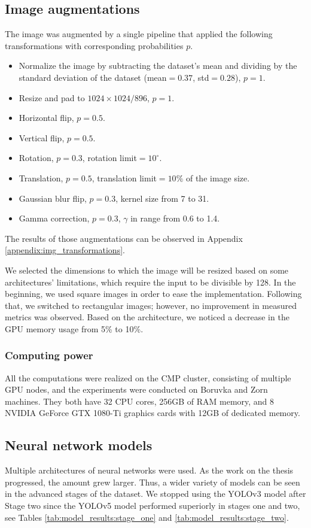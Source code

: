 \subsection{Image augmentations}
\label{sec:image_augmentations}
The image was augmented by a single pipeline that applied the following transformations with corresponding probabilities $p$.
\begin{itemize}
    \item Normalize the image by subtracting the dataset's mean and dividing by the standard deviation of the dataset (mean$=0.37$, std$=0.28$), $p=1$.
    \item Resize and pad to $1024\times1024/896$, $p=1$.
    \item Horizontal flip, $p=0.5$.
    \item Vertical flip, $p=0.5$.
    \item Rotation, $p=0.3$, rotation limit$=10^{\circ}$.
    \item Translation, $p=0.5$, translation limit$=10\%$ of the image size.
    \item Gaussian blur flip, $p=0.3$, kernel size from 7 to 31.
    \item Gamma correction, $p=0.3$, $\gamma$ in range from 0.6 to 1.4.
\end{itemize}
The results of those augmentations can be observed in Appendix \ref{appendix:img_transformations}.

We selected the dimensions to which the image will be resized based on some architectures' limitations, which require the input to be divisible by 128. In the beginning, we used square images in order to ease the implementation. Following that, we switched to rectangular images; however, no improvement in measured metrics was observed. Based on the architecture, we noticed a decrease in the GPU memory usage from 5\% to 10\%.

\subsubsection{Computing power}
All the computations were realized on the CMP cluster, consisting of multiple GPU nodes, and the experiments were conducted on Boruvka and Zorn machines. They  both have 32 CPU cores, 256GB of RAM memory, and 8 NVIDIA GeForce GTX 1080-Ti graphics cards with 12GB of dedicated memory.

\subsection{Neural network models}
\label{sec:methods:nns}
Multiple architectures of neural networks were used. As the work on the thesis progressed, the amount grew larger. Thus, a wider variety of models can be seen in the advanced stages of the dataset. We stopped using the YOLOv3 model after Stage two since the YOLOv5 model performed superiorly in stages one and two, see Tables \ref{tab:model_results:stage_one} and \ref{tab:model_results:stage_two}.

